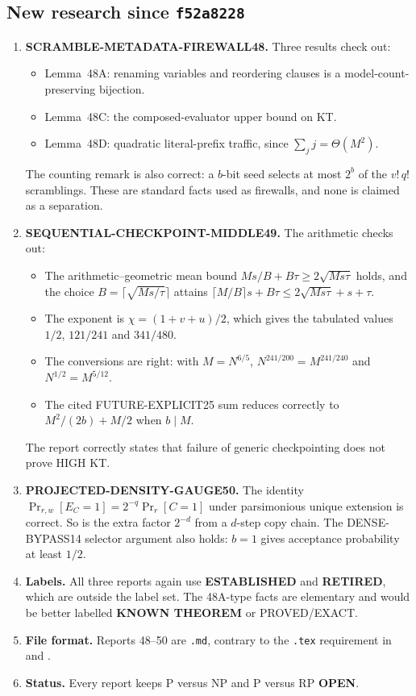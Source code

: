 \documentclass[11pt]{article}
\newcommand{\OPEN}{\textbf{OPEN}}
\newcommand{\KNOWN}{\textbf{KNOWN THEOREM}}
\begin{document}
\subsection{New research since \texttt{f52a8228}}
\begin{enumerate}
\item \textbf{SCRAMBLE-METADATA-FIREWALL48.} Three results check out:
\begin{itemize}
\item Lemma~48A: renaming variables and reordering clauses is a
model-count-preserving bijection.
\item Lemma~48C: the composed-evaluator upper bound on KT.
\item Lemma~48D: quadratic literal-prefix traffic, since
$\sum_j j=\Theta(M^2)$.
\end{itemize}
The counting remark is also correct: a $b$-bit seed selects at most
$2^b$ of the $v!\,q!$ scramblings. These are standard facts used as
firewalls, and none is claimed as a separation.
\item \textbf{SEQUENTIAL-CHECKPOINT-MIDDLE49.} The arithmetic checks out:
\begin{itemize}
\item The arithmetic--geometric mean bound
$Ms/B+B\tau\ge2\sqrt{Ms\tau}$ holds, and the choice
$B=\lceil\sqrt{Ms/\tau}\rceil$ attains
$\lceil M/B\rceil s+B\tau\le2\sqrt{Ms\tau}+s+\tau$.
\item The exponent is $\chi=(1+v+u)/2$, which gives the tabulated values
$1/2$, $121/241$ and $341/480$.
\item The conversions are right: with $M=N^{6/5}$,
$N^{241/200}=M^{241/240}$ and $N^{1/2}=M^{5/12}$.
\item The cited FUTURE-EXPLICIT25 sum reduces correctly to
$M^2/(2b)+M/2$ when $b\mid M$.
\end{itemize}
The report correctly states that failure of generic checkpointing does
not prove HIGH KT.
\item \textbf{PROJECTED-DENSITY-GAUGE50.} The identity
$\Pr_{r,w}[E_C=1]=2^{-q}\Pr_r[C=1]$ under parsimonious unique extension
is correct. So is the extra factor $2^{-d}$ from a $d$-step copy chain.
The DENSE-BYPASS14 selector argument also holds: $b=1$ gives acceptance
probability at least $1/2$.
\item \textbf{Labels.} All three reports again use \textbf{ESTABLISHED}
and \textbf{RETIRED}, which are outside the  label set.
The 48A-type facts are elementary and would be better labelled
\KNOWN{} or PROVED/EXACT.
\item \textbf{File format.} Reports 48--50 are \texttt{.md}, contrary to
the \texttt{.tex} requirement in  and .
\item \textbf{Status.} Every report keeps P versus NP and P versus RP
\OPEN{}.
\end{enumerate}
\end{document}
